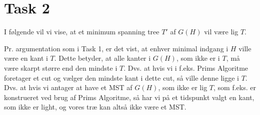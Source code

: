 \section{Task 2}

I følgende vil vi vise, at et minimum spanning tree $T'$ af $G(H)$ vil være lig $T$.

Pr. argumentation som i Task 1, er det vist, at enhver minimal indgang i $H$ ville være en kant i $T$. Dette betyder, at alle kanter i $G(H)$, som ikke er i $T$, må være skarpt større end den mindste i $T$.
Dvs. at hvis vi i f.eks. Prims Algoritme foretager et cut og vælger den mindste kant i dette cut, så ville denne ligge i $T$.
Dvs. at hvis vi antager at have et MST af $G(H)$, som ikke er lig $T$, som f.eks. er konstrueret ved brug af Prims Algoritme, så har vi på et tidspunkt valgt en kant, som ikke er light, og vores træ kan altså ikke være et MST. 
